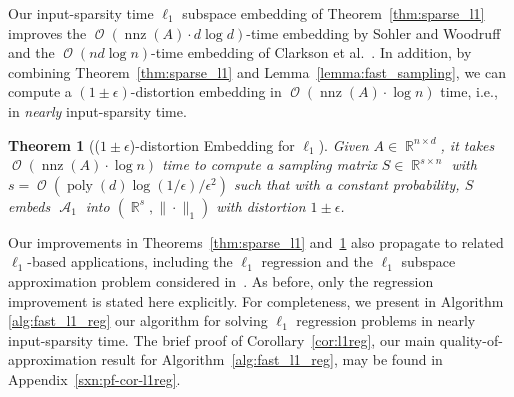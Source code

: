 \documentclass[11pt]{article}
\newtheorem{theorem}{Theorem}
\DeclareMathOperator{\poly}{poly}
\DeclareMathOperator{\bigO}{\mathcal{O}}
\DeclareMathOperator{\nnz}{nnz}
\DeclareMathOperator{\A}{\mathcal{A}}
\DeclareMathOperator{\R}{\mathbb{R}}
\begin{document}
Our input-sparsity time $\ell_1$ subspace embedding of
Theorem~\ref{thm:sparse_l1} improves the $\bigO(\nnz(A) \cdot d \log d)$-time
embedding by Sohler and Woodruff~\cite{SW11} and the $\bigO(n d \log n)$-time 
embedding of Clarkson et al.~\cite{CDMMMW13_SODA}.
In addition, by combining Theorem~\ref{thm:sparse_l1} and
Lemma~\ref{lemma:fast_sampling}, we can compute a $(1\pm\epsilon)$-distortion
embedding in $\bigO(\nnz(A) \cdot \log n)$ time, i.e., in \emph{nearly} 
input-sparsity time.

\begin{theorem}[($1\pm\epsilon$)-distortion Embedding for $\ell_1$]
  \label{thm:sparse_l1-eps}
  Given $A \in \R^{n \times d}$, it takes $\bigO(\nnz(A) \cdot \log n)$ time to
  compute a sampling matrix $S \in \R^{s \times n}$ with $s = \bigO(\poly(d)
  \log(1/\epsilon) / \epsilon^2)$ such that with a constant probability, $S$
  embeds $\A_1$ into $(\R^{s}, \|\cdot\|_1)$ with distortion $1 \pm \epsilon$.
\end{theorem}

Our improvements in Theorems~\ref{thm:sparse_l1} and~\ref{thm:sparse_l1-eps}
also propagate to related $\ell_1$-based applications, including the $\ell_1$
regression and the $\ell_1$ subspace approximation problem considered
in~\cite{SW11,CDMMMW13_SODA}.
As before, only the regression improvement is stated here explicitly.
For completeness, we present in Algorithm \ref{alg:fast_l1_reg} our algorithm
for solving $\ell_1$ regression problems in nearly input-sparsity time.
The brief proof of Corollary~\ref{cor:l1reg}, our main quality-of-approximation
result for Algorithm~\ref{alg:fast_l1_reg}, may be found in
Appendix~\ref{sxn:pf-cor-l1reg}.
\end{document}
